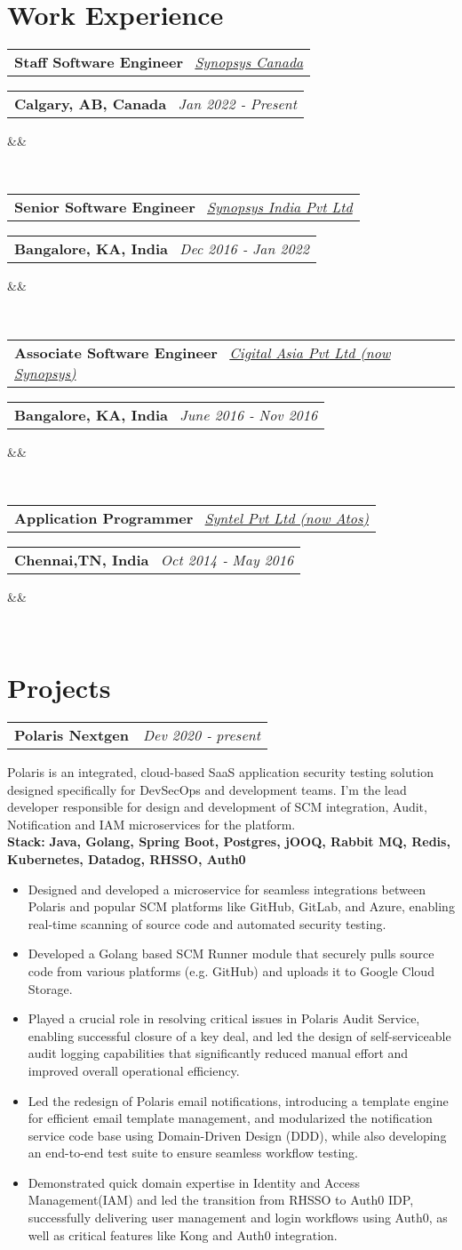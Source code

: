 \documentclass[14pt,a4paper,sans]{moderncv}
\makeatletter
\newcommand{\project}[5]{
    \noindent
    \begin{tabularx}{\textwidth}{Xr}
    \textbf{#1} & \textit{#2} \\
    \end{tabularx}
    #3 \\ %
    \noindent\textbf{Stack:} \textbf{#4} %
    \begin{itemize}[label=\textbullet, left=1em] %
    #5 %
    \end{itemize}
    \vspace{1em} %
}
\newcommand*{\customcventry}[7][.13em]{
    \begin{tabular}{@{}l}
    {\bfseries #4} \
        {\itshape #3}
    \end{tabular}
    \hfill
    \begin{tabular}{l@{}}
    {\bfseries #5} \
        {\itshape #2}
    \end{tabular}
    \ifx
        &#7&%
    \else
            {\
        \begin{minipage}{\maincolumnwidth}%
        \small#7%
        \end{minipage}}
    \fi%
    \par\addvspace{#1}}
\makeatother
\begin{document}
    \section{Work Experience}

    \customcventry{Jan 2022 ‐ Present}{{\color{blue}\href{https://www.synopsys.com/}{Synopsys Canada}}}{Staff Software Engineer}{Calgary, AB, Canada}{}{}

    \customcventry{Dec 2016 ‐ Jan 2022}{{\color{blue}\href{https://www.synopsys.com/}{Synopsys India Pvt Ltd}}}{Senior Software Engineer}{Bangalore, KA, India}{}{}

    \customcventry{June 2016 ‐ Nov 2016}{{\color{blue}\href{https://www.synopsys.com/}{Cigital Asia Pvt Ltd (now Synopsys)}}}{Associate Software Engineer}{Bangalore, KA, India}{}{}

    \customcventry{Oct 2014 ‐ May 2016}{{\color{blue}\href{https://atos.net/en/}{Syntel Pvt Ltd  (now Atos)}}}{Application Programmer}{Chennai,TN, India}{}{}


    \section{Projects}

    \project{Polaris Nextgen}{Dev 2020 ‐ present}
    {Polaris is an integrated, cloud-based SaaS application security testing solution designed specifically for DevSecOps and development teams.
    I'm the lead developer responsible for design and development of SCM integration, Audit, Notification and IAM microservices for the platform.}
    {Java, Golang, Spring Boot, Postgres, jOOQ, Rabbit MQ, Redis, Kubernetes, Datadog, RHSSO, Auth0}
    {
        \item Designed and developed a microservice for seamless integrations between Polaris and popular SCM platforms like GitHub, GitLab, and Azure, enabling real-time scanning of source code and automated security testing.
        \item Developed a Golang based SCM Runner module that securely pulls source code from various platforms (e.g. GitHub) and uploads it to Google Cloud Storage.
        \item Played a crucial role in resolving critical issues in Polaris Audit Service, enabling successful closure of a key deal, and led the design of self-serviceable audit logging capabilities that significantly reduced manual effort and improved overall operational efficiency.
        \item Led the redesign of Polaris email notifications, introducing a template engine for efficient email template management, and modularized the notification service code base using Domain-Driven Design (DDD), while also developing an end-to-end test suite to ensure seamless workflow testing.
        \item Demonstrated quick domain expertise in Identity and Access Management(IAM) and led the transition from RHSSO to Auth0 IDP, successfully delivering user management and login workflows using Auth0, as well as critical features like Kong and Auth0 integration.
    }
\end{document}
